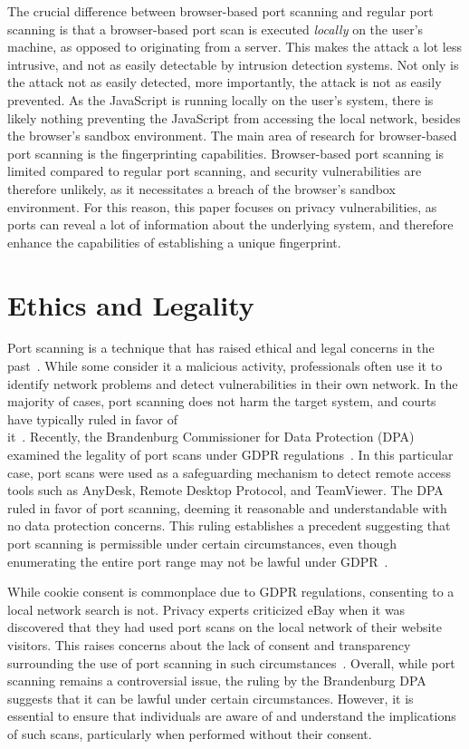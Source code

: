 The crucial difference between browser-based port scanning and regular port scanning is that a browser-based port scan is executed \emph{locally} on the user's machine, as opposed to originating from a server. 
This makes the attack a lot less intrusive, and not as easily detectable by intrusion detection systems. 
Not only is the attack not as easily detected, more importantly, the attack is not as easily prevented.
As the JavaScript is running locally on the user's system, there is likely nothing preventing the JavaScript from accessing the local network, besides the browser's sandbox environment.
The main area of research for browser-based port scanning is the fingerprinting capabilities. 
Browser-based port scanning is limited compared to regular port scanning, and security vulnerabilities are therefore unlikely, as it necessitates a breach of the browser's sandbox environment. 
For this reason, this paper focuses on privacy vulnerabilities, as ports can reveal a lot of information about the underlying system, and therefore enhance the capabilities of establishing a unique fingerprint.


\section{Ethics and Legality}
Port scanning is a technique that has raised ethical and legal concerns in the past~. While some consider it a malicious activity, professionals often use it to identify network problems and detect vulnerabilities in their own network. In the majority of cases, port scanning does not harm the target system, and courts have typically ruled in favor of \\ it~.
Recently, the Brandenburg Commissioner for Data Protection (DPA) examined the legality of port scans under GDPR regulations~. In this particular case, port scans were used as a safeguarding mechanism to detect remote access tools such as AnyDesk, Remote Desktop Protocol, and TeamViewer. The DPA ruled in favor of port scanning, deeming it reasonable and understandable with no data protection concerns. This ruling establishes a precedent suggesting that port scanning is permissible under certain circumstances, even though enumerating the entire port range may not be lawful under GDPR~.

While cookie consent is commonplace due to GDPR regulations, consenting to a local network search is not. Privacy experts criticized eBay when it was discovered that they had used port scans on the local network of their website visitors. This raises concerns about the lack of consent and transparency surrounding the use of port scanning in such circumstances~.
Overall, while port scanning remains a controversial issue, the ruling by the Brandenburg DPA suggests that it can be lawful under certain circumstances. However, it is essential to ensure that individuals are aware of and understand the implications of such scans, particularly when performed without their consent.